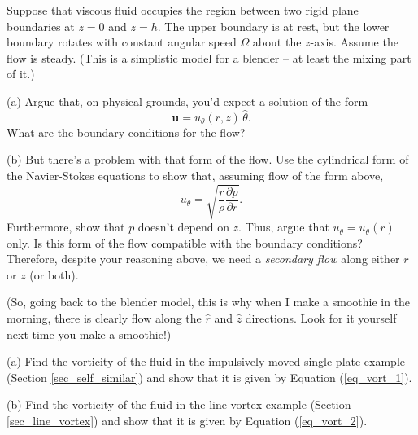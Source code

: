 \begin{problem}
\label{prob_spin_bottom}
Suppose that viscous fluid occupies the region between two rigid plane boundaries at $z = 0$ and $z = h$.  The upper boundary is at rest, but the lower boundary rotates with constant angular speed $\Omega$ about the $z$-axis.  Assume the flow is steady.  (This is a simplistic model for a blender -- at least the mixing part of it.)

(a) Argue that, on physical grounds, you'd expect a solution of the form
\[
\mathbf{u} = u_\theta (r, z) \, \hat{\theta}.
\]
What are the boundary conditions for the flow?

(b) But there's a problem with that form of the flow.  Use the cylindrical form of the Navier-Stokes equations to show that, assuming flow of the form above, 
\[
u_\theta = \sqrt{\frac{r}{\rho} \frac{\partial p}{\partial r} }.
\]
Furthermore, show that $p$ doesn't depend on $z$.  Thus, argue that $u_\theta = u_\theta(r)$ only.  Is this form of the flow compatible with the boundary conditions?  Therefore, despite your reasoning above, we need a \emph{secondary flow} along either $r$ or $z$ (or both).  

(So, going back to the blender model, this is why when I make a smoothie in the morning, there is clearly flow along the $\hat{r}$ and $\hat{z}$ directions.  Look for it yourself next time you make a smoothie!)
\end{problem}

\begin{problem}
\label{prob_vorticity}

(a) Find the vorticity of the fluid in the impulsively moved single plate example (Section \ref{sec_self_similar}) and show that it is given by Equation (\ref{eq_vort_1}).

(b) Find the vorticity of the fluid in the line vortex example (Section \ref{sec_line_vortex}) and show that it is given by Equation (\ref{eq_vort_2}).
\end{problem}


